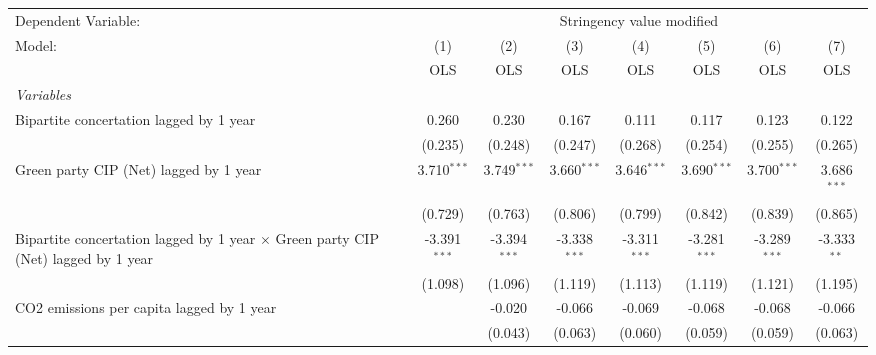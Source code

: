 
\begingroup
\centering
\begin{tabular}{lccccccc}
   \toprule
   Dependent Variable: & \multicolumn{7}{c}{Stringency value modified}\\
   Model:                                                                                   & (1)            & (2)            & (3)            & (4)            & (5)            & (6)            & (7)\\  
                                                                                            &  OLS           & OLS            & OLS            & OLS            & OLS            & OLS            & OLS\\  
   \midrule
   \emph{Variables}\\
   Bipartite concertation lagged by 1 year                                                  & 0.260          & 0.230          & 0.167          & 0.111          & 0.117          & 0.123          & 0.122\\   
                                                                                            & (0.235)        & (0.248)        & (0.247)        & (0.268)        & (0.254)        & (0.255)        & (0.265)\\   
   Green party CIP (Net) lagged by 1 year                                                   & 3.710$^{***}$  & 3.749$^{***}$  & 3.660$^{***}$  & 3.646$^{***}$  & 3.690$^{***}$  & 3.700$^{***}$  & 3.686$^{***}$\\   
                                                                                            & (0.729)        & (0.763)        & (0.806)        & (0.799)        & (0.842)        & (0.839)        & (0.865)\\   
   Bipartite concertation lagged by 1 year $\times$ Green party CIP (Net) lagged by 1 year  & -3.391$^{***}$ & -3.394$^{***}$ & -3.338$^{***}$ & -3.311$^{***}$ & -3.281$^{***}$ & -3.289$^{***}$ & -3.333$^{**}$\\   
                                                                                            & (1.098)        & (1.096)        & (1.119)        & (1.113)        & (1.119)        & (1.121)        & (1.195)\\   
   CO2 emissions per capita lagged by 1 year                                                &                & -0.020         & -0.066         & -0.069         & -0.068         & -0.068         & -0.066\\   
                                                                                            &                & (0.043)        & (0.063)        & (0.060)        & (0.059)        & (0.059)        & (0.063)\\   

\end{tabular}
